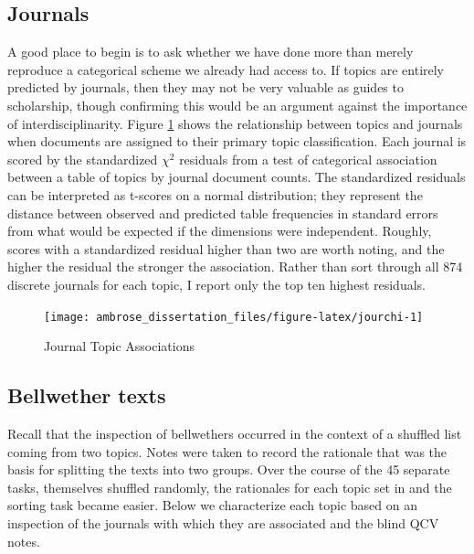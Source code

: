 \documentclass[]{book}
\theoremstyle{definition}
\theoremstyle{definition}
\theoremstyle{definition}
\theoremstyle{remark}
\begin{document}
\hypertarget{journals}{%
\subsection{Journals}\label{journals}}

A good place to begin is to ask whether we have done more than merely
reproduce a categorical scheme we already had access to. If topics are
entirely predicted by journals, then they may not be very valuable as
guides to scholarship, though confirming this would be an argument
against the importance of interdisciplinarity. Figure \ref{fig:jourchi}
shows the relationship between topics and journals when documents are
assigned to their primary topic classification. Each journal is scored
by the standardized \(\chi^2\) residuals from a test of categorical
association between a table of topics by journal document counts. The
standardized residuals can be interpreted as t-scores on a normal
distribution; they represent the distance between observed and predicted
table frequencies in standard errors from what would be expected if the
dimensions were independent. Roughly, scores with a standardized
residual higher than two are worth noting, and the higher the residual
the stronger the association. Rather than sort through all 874 discrete
journals for each topic, I report only the top ten highest residuals.

\begin{figure}

{\centering \texttt{[image: ambrose\_dissertation\_files/figure-latex/jourchi-1]} 

}

\caption{Journal Topic Associations}\label{fig:jourchi}
\end{figure}

\hypertarget{bellwether-texts}{%
\subsection{Bellwether texts}\label{bellwether-texts}}

Recall that the inspection of bellwethers occurred in the context of a
shuffled list coming from two topics. Notes were taken to record the
rationale that was the basis for splitting the texts into two groups.
Over the course of the 45 separate tasks, themselves shuffled randomly,
the rationales for each topic set in and the sorting task became easier.
Below we characterize each topic based on an inspection of the journals
with which they are associated and the blind QCV notes.
\end{document}
